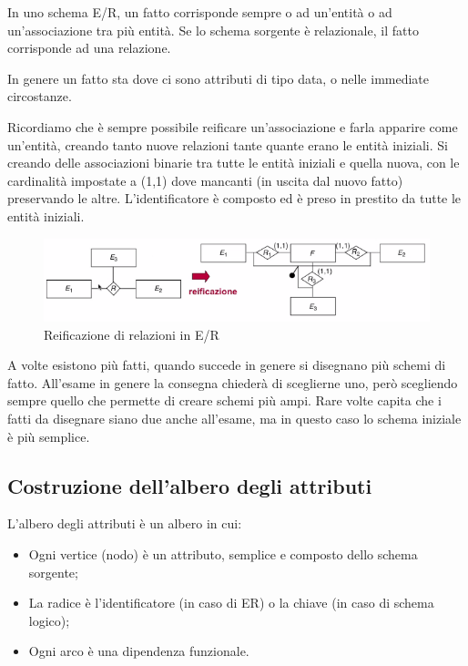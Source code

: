 \noindent In uno schema E/R, un fatto corrisponde sempre o ad un'entità o ad un'associazione tra più entità. Se lo schema sorgente è relazionale, il fatto corrisponde ad una relazione.

\begin{warn}
	In genere un fatto sta dove ci sono attributi di tipo data, o nelle immediate circostanze.
\end{warn}

\noindent Ricordiamo che è sempre possibile reificare un'associazione e farla apparire come un'entità, creando tanto nuove relazioni tante quante erano le entità iniziali. Si creando delle associazioni binarie tra tutte le entità iniziali e quella nuova, con le cardinalità impostate a (1,1) dove mancanti (in uscita dal nuovo fatto) preservando le altre. L'identificatore è composto ed è preso in prestito da tutte le entità iniziali.
\begin{figure}[H]
	\begin{center}
		\includegraphics[width=0.6\linewidth]{img/reif.PNG}
		\caption{Reificazione di relazioni in E/R}
	\end{center}
\end{figure}
\noindent A volte esistono più fatti, quando succede in genere si disegnano più schemi di fatto. All'esame in genere la consegna chiederà di sceglierne uno, però scegliendo sempre quello che permette di creare schemi più ampi. Rare volte capita che i fatti da disegnare siano due anche all'esame, ma in questo caso lo schema iniziale è più semplice.

\subsection{Costruzione dell'albero degli attributi}
L'albero degli attributi è un albero in cui:
\begin{itemize}
	\item Ogni vertice (nodo) è un attributo, semplice e composto dello schema sorgente;
	\item La radice è l'identificatore (in caso di ER) o la chiave (in caso di schema logico);
	\item Ogni arco è una dipendenza funzionale.
\end{itemize}

